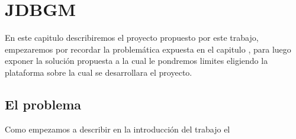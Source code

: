 \chapter{JDBGM}
En este capitulo describiremos el proyecto propuesto por este trabajo, empezaremos por recordar la problemática expuesta en el capitulo , para luego exponer la solución propuesta a la cual le pondremos limites eligiendo la plataforma sobre la cual se desarrollara el proyecto.

\section{El problema}
Como empezamos a describir en la introducción del trabajo el